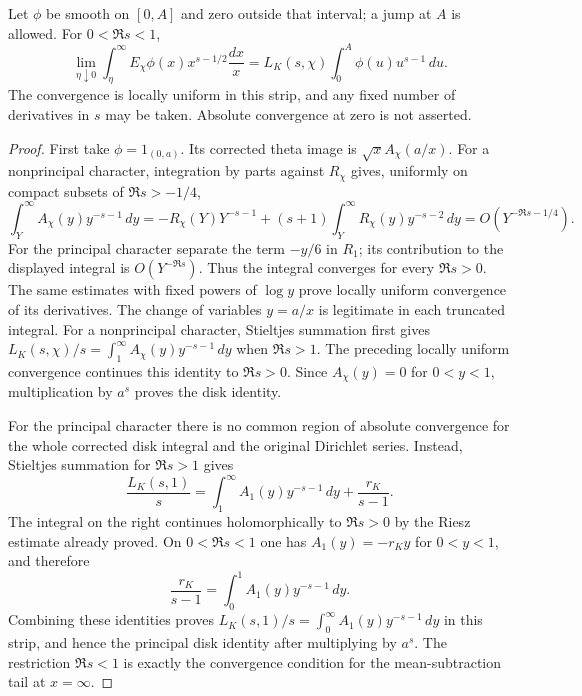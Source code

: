 \begin{proposition}
\label{prop:hecke-improper-mellin}
Let $\phi$ be smooth on $[0,A]$ and zero outside that interval; a
jump at $A$ is allowed.  For $0<\Re s<1$,
\begin{equation}\label{eq:hecke-improper-mellin}
 \lim_{\eta\downarrow0}\int_\eta^\infty
 E_\chi\phi(x)x^{s-1/2}\frac{dx}{x}
 =L_K(s,\chi)\int_0^A\phi(u)u^{s-1}\,du.
\end{equation}
The convergence is locally uniform in this strip, and any fixed
number of derivatives in $s$ may be taken.  Absolute convergence at
zero is not asserted.
\end{proposition}

\begin{proof}
First take $\phi=1_{(0,a)}$.  Its corrected theta image is
$\sqrt x A_\chi(a/x)$.  For a nonprincipal character, integration
by parts against $R_\chi$ gives, uniformly on compact subsets of
$\Re s>-1/4$,
\[
 \int_Y^\infty A_\chi(y)y^{-s-1}\,dy
 =-R_\chi(Y)Y^{-s-1}
 +(s+1)\int_Y^\infty R_\chi(y)y^{-s-2}\,dy
 =O(Y^{-\Re s-1/4}).
\]
For the principal character separate the term $-y/6$ in $R_1$;
its contribution to the displayed integral is $O(Y^{-\Re s})$.
Thus the integral converges for every $\Re s>0$.  The same estimates
with fixed powers of $\log y$ prove locally uniform convergence of
its derivatives.  The change of variables $y=a/x$ is legitimate in
each truncated integral.  For a nonprincipal character,
Stieltjes summation first gives
$L_K(s,\chi)/s=\int_1^\infty A_\chi(y)y^{-s-1}\,dy$
when $\Re s>1$.  The preceding locally uniform convergence
continues this identity to $\Re s>0$.  Since $A_\chi(y)=0$
for $0<y<1$, multiplication by $a^s$ proves the disk identity.

For the principal character there is no common region of absolute
convergence for the whole corrected disk integral and the original
Dirichlet series.  Instead, Stieltjes summation for $\Re s>1$ gives
\[
 \frac{L_K(s,1)}s
 =\int_1^\infty A_1(y)y^{-s-1}\,dy+\frac{r_K}{s-1}.
\]
The integral on the right continues holomorphically to $\Re s>0$
by the Riesz estimate already proved.  On $0<\Re s<1$ one has
$A_1(y)=-r_Ky$ for $0<y<1$, and therefore
\[
 \frac{r_K}{s-1}=\int_0^1 A_1(y)y^{-s-1}\,dy.
\]
Combining these identities proves
$L_K(s,1)/s=\int_0^\infty A_1(y)y^{-s-1}\,dy$
in this strip, and hence the principal disk identity after multiplying
by $a^s$.  The restriction $\Re s<1$ is exactly the convergence
condition for the mean-subtraction tail at $x=\infty$.


\end{proof}
